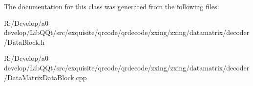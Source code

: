 The documentation for this class was generated from the following files\+:\begin{DoxyCompactItemize}
\item 
R\+:/\+Develop/a0-\/develop/\+Lib\+Q\+Qt/src/exquisite/qrcode/qrdecode/zxing/zxing/datamatrix/decoder/Data\+Block.\+h\item 
R\+:/\+Develop/a0-\/develop/\+Lib\+Q\+Qt/src/exquisite/qrcode/qrdecode/zxing/zxing/datamatrix/decoder/Data\+Matrix\+Data\+Block.\+cpp\end{DoxyCompactItemize}
